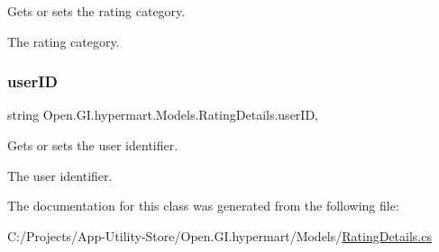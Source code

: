Gets or sets the rating category. 

The rating category. \hypertarget{class_open_1_1_g_i_1_1hypermart_1_1_models_1_1_rating_details_aafdd0169f033f4d9f2ccc055f938c524}{}\label{class_open_1_1_g_i_1_1hypermart_1_1_models_1_1_rating_details_aafdd0169f033f4d9f2ccc055f938c524} 
\subsubsection{\texorpdfstring{user\+ID}{userID}}
{\footnotesize\ttfamily string Open.\+G\+I.\+hypermart.\+Models.\+Rating\+Details.\+user\+ID\hspace{0.3cm}{\ttfamily [get]}, {\ttfamily [set]}}



Gets or sets the user identifier. 

The user identifier. 

The documentation for this class was generated from the following file\+:\begin{DoxyCompactItemize}
\item 
C\+:/\+Projects/\+App-\/\+Utility-\/\+Store/\+Open.\+G\+I.\+hypermart/\+Models/\hyperlink{_rating_details_8cs}{Rating\+Details.\+cs}\end{DoxyCompactItemize}
